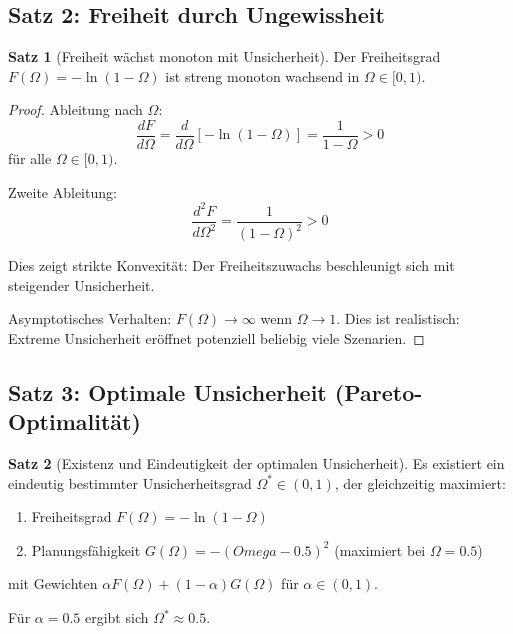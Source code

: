 \documentclass[a4paper,12pt]{article}
\theoremstyle{definition}
\newtheorem{satz}{Satz}
\begin{document}
\subsection{Satz 2: Freiheit durch Ungewissheit}

\begin{satz}[Freiheit wächst monoton mit Unsicherheit]
    \label{satz:freiheit_omega}
    Der Freiheitsgrad $F(\Omega) = -\ln(1-\Omega)$ ist streng monoton wachsend in $\Omega \in [0,1)$.
\end{satz}

\begin{proof}
    Ableitung nach $\Omega$:
    \begin{equation}
        \frac{dF}{d\Omega} = \frac{d}{d\Omega}[-\ln(1-\Omega)] = \frac{1}{1-\Omega} > 0
    \end{equation}
    für alle $\Omega \in [0,1)$.
    
    Zweite Ableitung:
    \begin{equation}
        \frac{d^2F}{d\Omega^2} = \frac{1}{(1-\Omega)^2} > 0
    \end{equation}
    
    Dies zeigt strikte Konvexität: Der Freiheitszuwachs beschleunigt sich mit steigender Unsicherheit.
    
    Asymptotisches Verhalten: $F(\Omega) \to \infty$ wenn $\Omega \to 1$. Dies ist realistisch: Extreme Unsicherheit eröffnet potenziell beliebig viele Szenarien.
\end{proof}

\subsection{Satz 3: Optimale Unsicherheit (Pareto-Optimalität)}

\begin{satz}[Existenz und Eindeutigkeit der optimalen Unsicherheit]
    \label{satz:optimal_omega}
    Es existiert ein eindeutig bestimmter Unsicherheitsgrad $\Omega^* \in (0,1)$, der gleichzeitig maximiert:
    \begin{enumerate}
        \item Freiheitsgrad $F(\Omega) = -\ln(1-\Omega)$
        \item Planungsfähigkeit $G(\Omega) = -(Omega-0.5)^2$ (maximiert bei $\Omega = 0.5$)
    \end{enumerate}
    mit Gewichten $\alpha F(\Omega) + (1-\alpha) G(\Omega)$ für $\alpha \in (0,1)$.
    
    Für $\alpha = 0.5$ ergibt sich $\Omega^* \approx 0.5$.
\end{satz}
\end{document}
